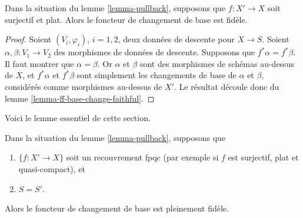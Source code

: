 \begin{lemma}
\label{lemma-faithful}
Dans la situation du lemme \ref{lemma-pullback}, supposons que
$f : X' \to X$ soit surjectif et plat. Alors le foncteur de changement de
base est fidèle.
\end{lemma}

\begin{proof}
Soient $(V_i, \varphi_i)$, $i = 1, 2$, deux données de descente pour
$X \to S$. Soient $\alpha, \beta : V_1 \to V_2$ des morphismes de données
de descente. Supposons que $f^*\alpha = f^*\beta$. Il faut montrer que
$\alpha = \beta$. Or $\alpha$ et $\beta$ sont des morphismes de schémas
au-dessus de $X$, et $f^*\alpha$ et $f^*\beta$ sont simplement les
changements de base de $\alpha$ et $\beta$, considérés comme morphismes
au-dessus de $X'$.
Le résultat découle donc du
lemme \ref{lemma-ff-base-change-faithful}.
\end{proof}

\noindent
Voici le lemme essentiel de cette section.

\begin{lemma}
\label{lemma-fully-faithful}
Dans la situation du lemme \ref{lemma-pullback}, supposons que
\begin{enumerate}
\item $\{f : X' \to X\}$ soit un recouvrement fpqc (par exemple si $f$ est
surjectif, plat et quasi-compact), et
\item $S = S'$.
\end{enumerate}
Alors le foncteur de changement de base est pleinement fidèle.
\end{lemma}

